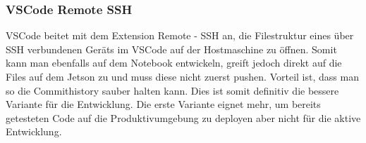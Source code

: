 \subsubsection{VSCode Remote SSH}
VSCode beitet mit dem Extension Remote - SSH \cite{VSCode-Remote-SSH} an, die Filestruktur eines über SSH verbundenen Geräts im VSCode auf der Hostmaschine zu öffnen. Somit kann man ebenfalls auf dem Notebook entwickeln, greift jedoch direkt auf die Files auf dem Jetson zu und muss diese nicht zuerst pushen. Vorteil ist, dass man so die Commithistory sauber halten kann. Dies ist somit definitiv die bessere Variante für die Entwicklung. Die erste Variante eignet mehr, um bereits getesteten Code auf die Produktivumgebung zu deployen aber nicht für die aktive Entwicklung.





  